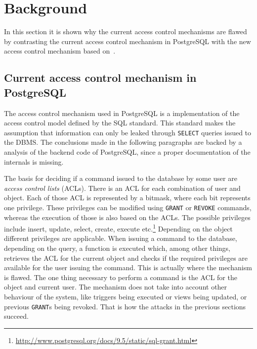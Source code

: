 \section{Background}

In this section it is shown why the current access control mechanisms are flawed by contrasting the current access control mechanism in PostgreSQL with the new access control mechanism based on~\cite{guarnieri2016strong}.
%
\subsection{Current access control mechanism in PostgreSQL}
%
The access control mechanism used in PostgreSQL is a implementation of the access control model defined by the SQL standard.
%
This standard makes the assumption that information can only be leaked through \texttt{SELECT} queries issued to the DBMS.
%
The conclusions made in the following paragraphs are backed by a analysis of the backend code of PostgreSQL, since a proper documentation of the internals is missing.

The basis for deciding if a command issued to the database by some user are \emph{access control lists} (ACLs). 
%
There is an ACL for each combination of user and object.
%
Each of those ACL is represented by a bitmask, where each bit represents one privilege.
%
These privileges can be modified using \texttt{GRANT} or \texttt{REVOKE} commands, whereas the execution of those is also based on the ACLs.
%
The possible privileges include insert, update, select, create, execute etc.\footnote{\url{http://www.postgresql.org/docs/9.5/static/sql-grant.html}}
%
Depending on the object different privileges are applicable.
%
When issuing a command to the database, depending on the query, a function is executed which, among other things, retrieves the ACL for the current object and checks if the required privileges are available for the user issuing the command.
%
This is actually where the mechanism is flawed.
% 
The one thing necessary to perform a command is the ACL for the object and current user.
%
The mechanism does not take into account other behaviour of the system, like triggers being executed or views being updated, or previous \texttt{GRANT}s being revoked.
%
That is how the attacks in the previous sections succeed.
%
